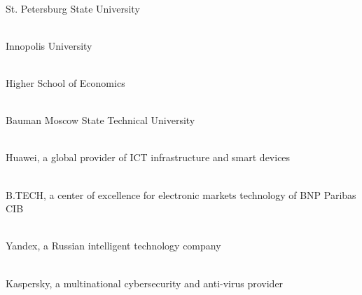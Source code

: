 
\cleardoublepage
{}

\newcommand\partner[3]{ \\ #3}

\partner{height=0.7in}{partners/spbu}{St. Petersburg State University}

\partner{height=0.7in}{partners/iu}{Innopolis University}

\partner{height=0.8in}{partners/hse}{Higher School of Economics}

\partner{height=0.8in}{partners/bauman}{Bauman Moscow State Technical University}

\partner{height=0.5in}{partners/huawei}{Huawei, a global provider of ICT infrastructure and smart devices}

\partner{width=0.7in}{partners/bnp}{B.TECH, a center of excellence for electronic markets technology of BNP Paribas CIB}

\partner{width=1.2in}{partners/yandex}{Yandex, a Russian intelligent technology company}

\partner{width=2in}{partners/kaspersky}{Kaspersky, a multinational cybersecurity and anti-virus provider}
